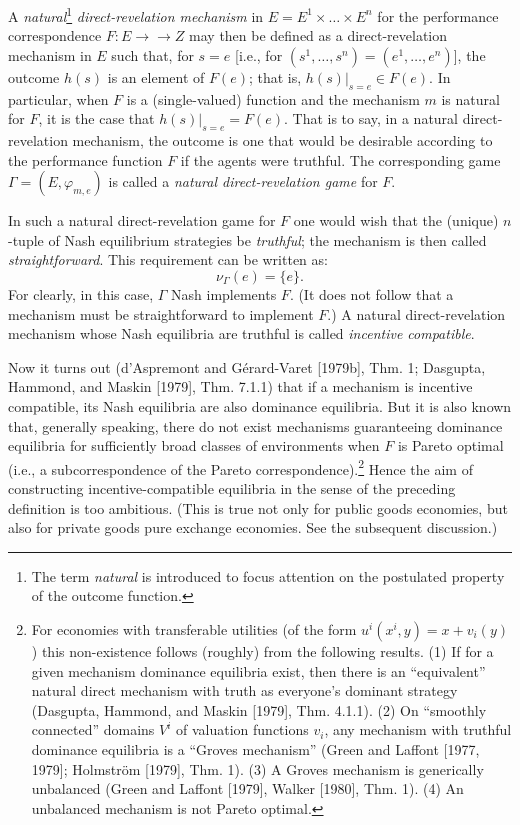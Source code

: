 \documentclass[12pt, letterpaper]{article}
\begin{document}
A \textit{natural}\footnote{The term \textit{natural} is introduced to focus attention on the postulated property of the outcome function.} \textit{direct-revelation mechanism} in $E = E^1 \times \dots \times E^n$ for the performance correspondence $F \colon E \to\to Z$ may then be defined as a direct-revelation mechanism in $E$ such that, for $s = e$ [i.e., for $(s^1, \dots, s^n) = (e^1, \dots, e^n)$], the outcome $h(s)$ is an element of $F(e)$; that is, $h(s)|_{s=e} \in F(e)$. In particular, when $F$ is a (single-valued) function and the mechanism $m$ is natural for $F$, it is the case that $h(s)|_{s=e} = F(e)$. That is to say, in a natural direct-revelation mechanism, the outcome is one that would be desirable according to the performance function $F$ if the agents were truthful. The corresponding game $\Gamma = (E, \varphi_{m,e})$ is called a \textit{natural direct-revelation game} for $F$.

In such a natural direct-revelation game for $F$ one would wish that the (unique) $n$-tuple of Nash equilibrium strategies be \textit{truthful}; the mechanism is then called \textit{straightforward}. This requirement can be written as:
\[
\nu_\Gamma(e) = \{e\}.
\]
For clearly, in this case, $\Gamma$ Nash implements $F$. (It does not follow that a mechanism must be straightforward to implement $F$.) A natural direct-revelation mechanism whose Nash equilibria are truthful is called \textit{incentive compatible}.

Now it turns out (d'Aspremont and Gérard-Varet [1979b], Thm. 1; Dasgupta, Hammond, and Maskin [1979], Thm. 7.1.1) that if a mechanism is incentive compatible, its Nash equilibria are also dominance equilibria. But it is also known that, generally speaking, there do not exist mechanisms guaranteeing dominance equilibria for sufficiently broad classes of environments when $F$ is Pareto optimal (i.e., a subcorrespondence of the Pareto correspondence).\footnote{For economies with transferable utilities (of the form $u^i(x^i, y) = x + v_i(y)$) this non-existence follows (roughly) from the following results. (1) If for a given mechanism dominance equilibria exist, then there is an ``equivalent'' natural direct mechanism with truth as everyone's dominant strategy (Dasgupta, Hammond, and Maskin [1979], Thm. 4.1.1). (2) On ``smoothly connected'' domains $V^i$ of valuation functions $v_i$, any mechanism with truthful dominance equilibria is a ``Groves mechanism'' (Green and Laffont [1977, 1979]; Holmström [1979], Thm. 1). (3) A Groves mechanism is generically unbalanced (Green and Laffont [1979], Walker [1980], Thm. 1). (4) An unbalanced mechanism is not Pareto optimal.} Hence the aim of constructing incentive-compatible equilibria in the sense of the preceding definition is too ambitious. (This is true not only for public goods economies, but also for private goods pure exchange economies. See the subsequent discussion.)
\end{document}
